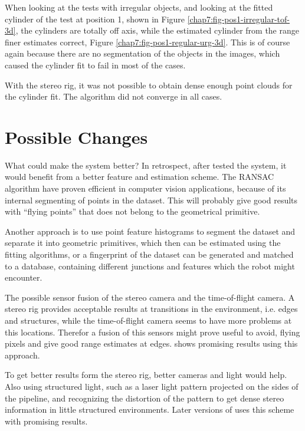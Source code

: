 When looking at the tests with irregular objects, and looking at the fitted cylinder of
the test at position 1, shown in Figure \ref{chap7:fig-pos1-irregular-tof-3d}, the
cylinders are totally off axis, while the estimated cylinder from the range finer
estimates correct, Figure \ref{chap7:fig-pos1-regular-urg-3d}. This is of course again
because there are no segmentation of the objects in the images, which caused the cylinder
fit to fail in most of the cases. 

With the stereo rig, it was not possible to obtain dense enough point clouds for the
cylinder fit. The algorithm did not converge in all cases. 

\section{Possible Changes}
What could make the system better? In retrospect, after tested the system, it would
benefit from a better feature and estimation scheme. The RANSAC algorithm have proven
efficient in computer vision applications, because of its internal segmenting of points in 
the dataset. This will probably give good results with ``flying points'' that does not
belong to the geometrical primitive. 

Another approach is to use point feature histograms to segment the dataset and separate it
into geometric primitives, which then can be estimated using the fitting algorithms, or a
fingerprint of the dataset can be generated and matched to a database, containing
different junctions and features which the robot might encounter. 

The possible sensor fusion of the stereo camera and the time-of-flight camera. A stereo
rig provides acceptable results at transitions in the environment, i.e. edges and
structures, while the time-of-flight camera seems to have more problems at this locations.
Therefor a fusion of this sensors might prove useful to avoid, flying pixels and give good
range estimates at edges. \cite{tof-stereo-fusion} shows promising results using this
approach. 

To get better results form the stereo rig, better cameras and light would help. Also using
structured light, such as a laser light pattern projected on the sides of the pipeline,
and recognizing the distortion of the pattern to get dense stereo information in little
structured environments. Later versions of \cite{makro-plus} uses this scheme with promising
results. 


